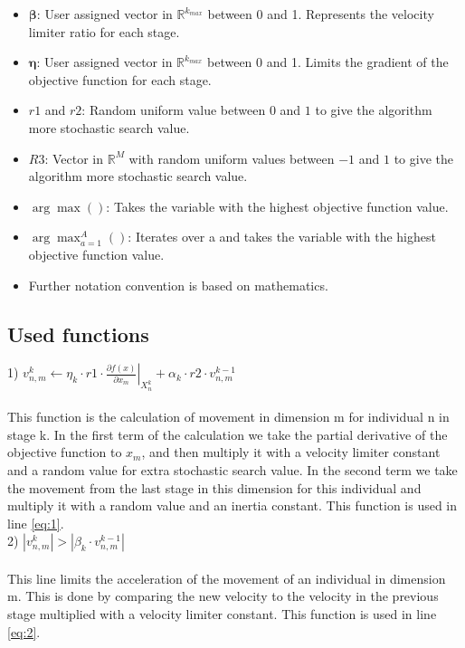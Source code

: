\documentclass[runningheads]{llncs}
\begin{document}
\begin{itemize}
    \item $\boldsymbol{\beta}$: User assigned vector in $\mathds{R}^{k_{max}}$ between 0 and 1. Represents the velocity limiter ratio for each stage.
    \item $\boldsymbol{\eta}$: User assigned vector in $\mathds{R}^{k_{max}}$ between 0 and 1. Limits the gradient of the objective function for each stage.
    \item $ r1 $ and $r2 $: Random uniform value between $ 0 $ and $ 1$ to give the algorithm more stochastic search value.
    \item $ R3 $: Vector in $\mathds{R}^M$ with random uniform values between $ -1 $ and $ 1$ to give the algorithm more stochastic search value.
    \item $\arg \max() $: Takes the variable with the highest objective function value.
    \item $\arg \max_{a=1}^A()$: Iterates over a and takes the variable with the highest objective function value.
    \item Further notation convention is based on mathematics.
\end{itemize}

\subsection{Used functions}

1) $
v_{n,m}^k \leftarrow \eta _k \cdot r1 \cdot  \left. \frac{\partial f(x)}{\partial x_m} \right \rvert_{X_{n}^k} + \alpha_k \cdot r2 \cdot v_{n,m}^{k-1}
$ \\ \\
This function is the calculation of movement in dimension m for individual n in stage k. In the first term of the calculation we take the partial derivative of the objective function to $x_m$, and then multiply it with a velocity limiter constant and a random value for extra stochastic search value. In the second term we take the movement from the last stage in this dimension for this individual and multiply it with a random value and an inertia constant. This function is used in line \ref{eq:1}. \\ 

2) $
\left \lvert v_{n,m}^k \right \rvert  > \left \lvert \beta_k \cdot v_{n,m}^{k-1} \right \rvert
$ \\ \\
This line limits the acceleration of the movement of an individual in dimension m. This is done by comparing the new velocity to the velocity in the previous stage multiplied with a velocity limiter constant. This function is used in line \ref{eq:2}. \\ 
\end{document}
